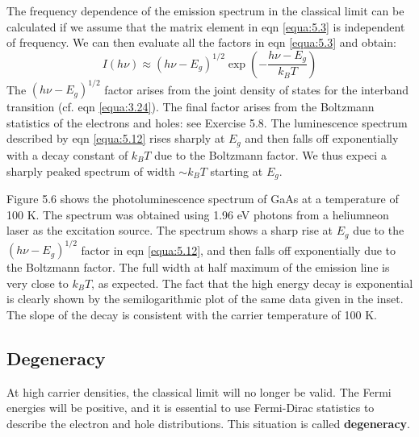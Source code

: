 \documentclass[12pt]{book}
\begin{document}
The frequency dependence of the emission spectrum in the classical limit can be calculated if we assume that the matrix element in eqn \ref{equa:5.3} is independent of frequency. We can then evaluate all the factors in eqn \ref{equa:5.3} and obtain:
\begin{equation}\label{equa:5.12}
  I(h\nu)\approx(h\nu-E_g)^{1/2}\exp(-\frac{h\nu-E_g}{k_BT})
\end{equation}
The $(h\nu - E_g)^{1/2}$ factor arises from the joint density of states for the interband transition (cf. eqn \ref{equa:3.24}). The final factor arises from the Boltzmann statistics of the electrons and holes: see Exercise 5.8. The luminescence spectrum described by eqn \ref{equa:5.12} rises sharply at $E_g$ and then falls off exponentially with a decay constant of $k_BT$ due to the Boltzmann factor. We thus expeci a sharply peaked spectrum of width $\sim k_BT$ starting at $E_g$.

Figure 5.6 shows the photoluminescence spectrum of GaAs at a temperature of 100 K. The spectrum was obtained using 1.96 eV photons from a heliumneon laser as the excitation source. The spectrum shows a sharp rise at $E_g$ due to the $(h\nu- E_g)^{1/2}$ factor in eqn \ref{equa:5.12}, and then falls off exponentially due to the Boltzmann factor. The full width at half maximum of the emission line is very close to $k_B T$, as expected. The fact that the high energy decay is exponential is clearly shown by the semilogarithmic plot of the same data given in the inset. The slope of the decay is consistent with the carrier temperature of 100 K.

\subsection{Degeneracy}
At high carrier densities, the classical limit will no longer be valid. The Fermi energies will be positive, and it is essential to use Fermi-Dirac statistics to describe the electron and hole distributions. This situation is called \textbf{degeneracy}.
\end{document}
